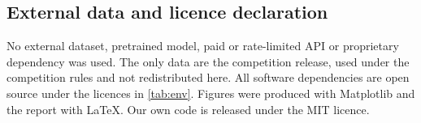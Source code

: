 \subsection{External data and licence declaration}
No external dataset, pretrained model, paid or rate-limited API or proprietary dependency was used. The only data are
the competition release, used under the competition rules and not redistributed here. All software dependencies are
open source under the licences in \cref{tab:env}. Figures were produced with Matplotlib and the report with \LaTeX.
Our own code is released under the MIT licence.
